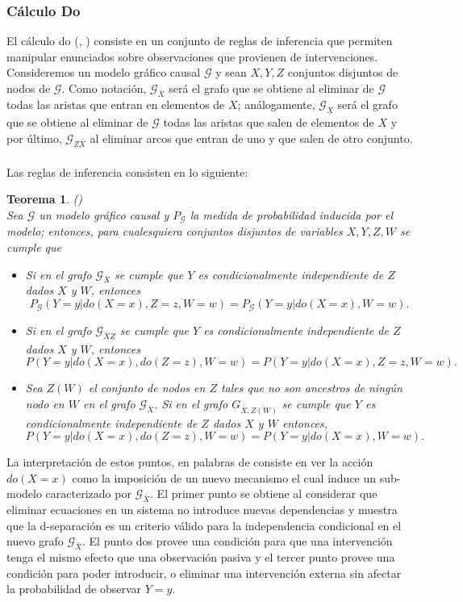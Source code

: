 \documentclass[11pt]{article}
\theoremstyle{plain}
\newtheorem{teo}{Teorema}
\begin{document}
\subsubsection{Cálculo Do}
El cálculo do (\cite{pearl1995causal}, \cite{pearl2009causality}) consiste en un conjunto de reglas de inferencia que permiten manipular enunciados sobre observaciones que provienen de 		intervenciones. Consideremos un modelo gráfico causal $\mathcal{G}$ y sean $X,Y,Z$ conjuntos disjuntos de nodos de $\mathcal{G}$. Como notación, $\mathcal{G}_{\bar{X}}$ será el grafo que 	se obtiene al eliminar de $\mathcal{G}$ todas las aristas que entran en elementos de $X$; análogamente, $\mathcal{G}_{\underline{X}}$ será el grafo que se obtiene al eliminar de $\mathcal{G}$ todas las aristas que salen de elementos de $X$ y por último, $\mathcal{G}_{\underline{Z}\bar{X}}$ al eliminar arcos que entran de uno y que salen de otro conjunto.\\
\\
Las reglas de inferencia consisten en lo siguiente:
\begin{teo}{\label{docalculus}} (\cite{pearl2009causality})\\
Sea $\mathcal{G}$ un modelo gráfico causal y $P_{\mathcal{G}}$ la medida de probabilidad inducida por el modelo; entonces, para cualesquiera conjuntos disjuntos de variables $X,Y,Z,W$ se cumple que
\begin{itemize}
\item Si en el grafo $\mathcal{G}_{\bar{X}}$ se cumple que $Y$ es condicionalmente independiente de $Z$ dados $X$ y $W$, entonces
\[ P_{\mathcal{G}}(Y=y | do(X=x), Z=z, W=w) = P_{\mathcal{G}}(Y=y | do(X=x), W=w). \]
\item Si en el grafo $\mathcal{G}_{\bar{X}\underline{Z}}$ se cumple que $Y$ es condicionalmente independiente de $Z$ dados $X$ y $W$, entonces
\[ P(Y=y | do(X=x), do(Z=z), W=w) = P(Y=y | do(X=x), Z = z, W=w). \]
\item Sea $Z(W)$ el conjunto de nodos en $Z$ tales que no son ancestros de ningún nodo en $W$ en el grafo $\mathcal{G}_{\bar{X}}$. Si en el grafo $G_{\bar{X}, \bar{Z(W)}}$ se cumple que $Y$ es condicionalmente independiente de $Z$ dados $X$ y $W$ entonces,
\[ P(Y=y | do(X=x), do(Z=z), W=w) = P(Y=y | do(X=x), W=w). \]
\end{itemize}
\end{teo}
\indent La interpretación de estos puntos, en palabras de \cite{pearl2009causality} consiste en ver la acción $do(X=x)$ como la imposición de un nuevo mecanismo el cual induce un sub-modelo caracterizado por $\mathcal{G}_{\bar{X}}$. El primer punto se obtiene al considerar que eliminar ecuaciones en un sistema no introduce nuevas dependencias y muestra que la d-separación es un criterio válido para la independencia condicional en el nuevo grafo $\mathcal{G}_{\bar{X}}$. El punto dos provee una condición para que una intervención tenga el mismo efecto que una observación pasiva y el tercer punto provee una condición para poder introducir, o eliminar una intervención externa sin afectar la probabilidad de observar $Y=y$.\\
\end{document}
